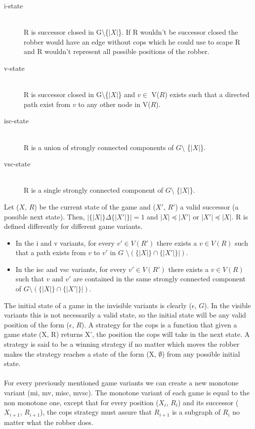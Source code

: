 \begin{description}
\item[i-state] \hfill \\
R is successor closed in G\textbackslash \{$|X|$\}. If R wouldn't be successor closed the robber would have an edge without cops which he could use to scape R and R wouldn't represent all possible positions of the robber.
\item[v-state] \hfill \\
R is successor closed in G\textbackslash \{$|X|$\} and $v \in$ V($R$) exists such that a directed path exist from $v$ to any other node in V($R$).
\item[isc-state] \hfill \\
R is a union of strongly connected components of $G \setminus$ \{$|X|$\}.
\item[vsc-state] \hfill \\
R is a single strongly connected component of $G \setminus$ \{$|X|$\}.
\end{description}

Let ($X$, $R$) be the current state of the game and ($X'$, $R'$) a valid successor (a possible next state). Then, $| \{|X|\} \Delta \{|X'|\}| = 1$ and $|X|\preceq |X'|$ or $|X'|\preceq |X|$. R is defined differently for different game variants.
\begin{itemize}
\item In the i and v variants, for every $v' \in V(R')$ there exists a $v \in V(R)$ such that a path exists from $v$ to $v'$ in $G$ $\setminus (\{|X|\} \cap \{|X'|\}|).$
\item In the isc and vsc variants, for every $v' \in V(R')$ there exists a $v \in V(R)$ such that $v$ and $v'$ are contained in the same strongly connected component of $G \setminus (\{|X|\} \cap \{|X'|\}|).$
\end{itemize}

The initial state of a game in the invisible variants is clearly ($\epsilon$, $G$). In the visible variants this is not necessarily a valid state, so the initial state will be any valid position of the form ($\epsilon$, $R$). A strategy for the cops is a function that given a game state (X, R) returns X', the position the cops will take in the next state. A strategy is said to be a winning strategy if no matter which moves the robber makes the strategy reaches a state of the form (X, $\emptyset$) from any possible initial state.

\paragraph{}
For every previously mentioned game variants we can create a new monotone variant (mi, mv, misc, mvsc). The monotone variant of each game is equal to the non monotone one, except that for every position ($X_i$, $R_i$) and its successor ($X_{i+1}$, $R_{i+1}$), the cops strategy must assure that $R_{i+1}$ is a subgraph of $R_i$ no matter what the robber does. 

